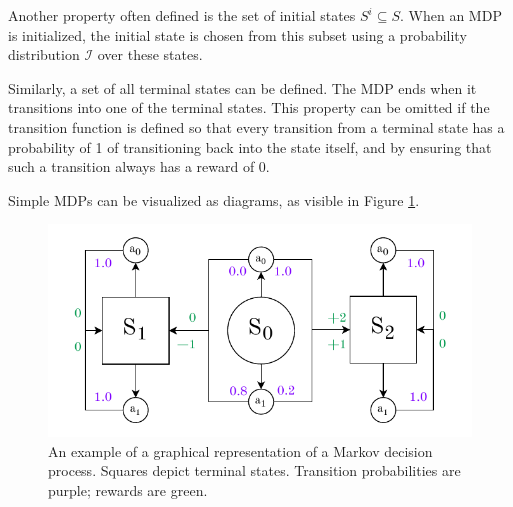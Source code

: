 \documentclass[
  digital,     %
  oneside,     %
  nosansbold,  %
  nocolorbold, %
  lof,         %
  lot,         %
]{fithesis4}
\begin{document}
Another property often defined is the set of initial states $S^i \subseteq S$. When an MDP is initialized, the initial state is chosen from this subset using a probability distribution $\mathcal{I}$ over these states.

Similarly, a set of all terminal states can be defined. The MDP ends when it transitions into one of the terminal states. This property can be omitted if the transition function is defined so that every transition from a terminal state has a probability of 1 of transitioning back into the state itself, and by ensuring that such a transition always has a reward of 0.

Simple MDPs can be visualized as diagrams, as visible in Figure \ref{fig:mdp}.

\begin{figure}
    \centering
    \includegraphics[width=1\linewidth]{diagrams/mdp.pdf}
    \caption{An example of a graphical representation of a Markov decision process. Squares depict terminal states. Transition probabilities are purple; rewards are green.}
    \label{fig:mdp}
\end{figure}
\end{document}
